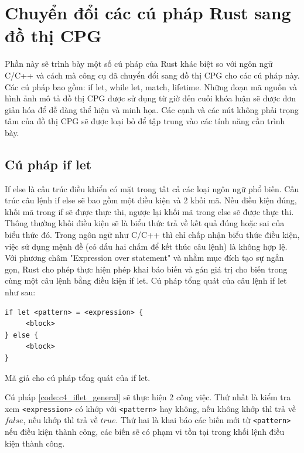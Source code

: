 \section{Chuyển đổi các cú pháp Rust sang đồ thị CPG}

Phần này sẽ trình bày một số cú pháp của Rust khác biệt so với ngôn ngữ C/C++ và cách mà công cụ đã chuyển đổi sang đồ thị CPG cho các cú pháp này.
Các cú pháp bao gồm: if let, while let, match, lifetime.
Những đoạn mã nguồn và hình ảnh mô tả đồ thị CPG được sử dụng từ giờ đến cuối khóa luận sẽ được đơn giản hóa để dễ dàng thể hiện và minh họa.
Các cạnh và các nút không phải trọng tâm của đồ thị CPG sẽ được loại bỏ để tập trung vào các tính năng cần trình bày.

\subsection{Cú pháp if let}
If else là cấu trúc điều khiển có mặt trong tất cả các loại ngôn ngữ phổ biến.
Cấu trúc câu lệnh if else sẽ bao gồm một điều kiện và 2 khối mã.
Nếu điều kiện đúng, khối mã trong if sẽ được thực thi, ngược lại khối mã trong else sẽ được thực thi.
Thông thường khối điều kiện sẽ là biểu thức trả về kết quả đúng hoặc sai của biểu thức đó.
Trong ngôn ngữ như C/C++ thì chỉ chấp nhận biểu thức điều kiện, việc sử dụng mệnh đề (có dấu hai chấm để kết thúc câu lệnh) là không hợp lệ.
Với phương châm "Expression over statement" và nhằm mục đích tạo sự ngắn gọn, Rust cho phép thực hiện phép khai báo biến và gán giá trị cho biến trong cùng một câu lệnh bằng điều kiện if let.
Cú pháp tổng quát của câu lệnh if let như sau:

\begin{listing}[H]
\begin{verbatim}
if let <pattern> = <expression> {
     <block>
} else {
     <block>
}
\end{verbatim}
\caption{Mã giả cho cú pháp tổng quát của if let.}
\label{code:c4_iflet_general}
\end{listing}

Cú pháp \ref{code:c4_iflet_general} sẽ thực hiện 2 công việc.
Thứ nhất là kiểm tra xem \texttt{<expression>} có khớp với \texttt{<pattern>} hay không, nếu không khớp thì trả về $false$, nếu khớp thì trả về $true$.
Thứ hai là khai báo các biến mới từ \texttt{<pattern>} nếu điều kiện thành công, các biến sẽ có phạm vi tồn tại trong khối lệnh điều kiện thành công.

